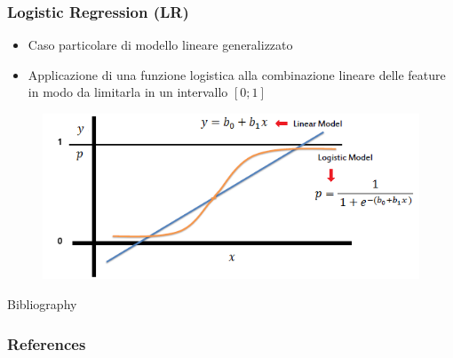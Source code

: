 \documentclass{beamer}
\begin{document}
\begin{frame}
	\frametitle{Logistic Regression (LR)}
	\begin{itemize}
		\item Caso particolare di modello lineare generalizzato
		\item Applicazione di una funzione logistica alla combinazione lineare delle feature in modo da limitarla in un intervallo $[0;1]$ 
	\end{itemize}
	\begin{figure}[htb]
		\includegraphics[width=.9\textwidth]{figure/LogReg.png}
	\end{figure}
\end{frame}

\begin{frame}{Bibliography}
	\frametitle{References}
	
	
\end{frame}
\end{document}
